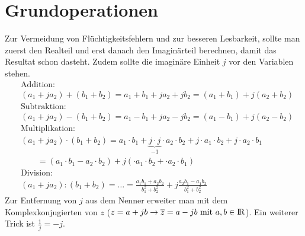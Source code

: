 \section{Grundoperationen}
Zur Vermeidung von Flüchtigkeitsfehlern und zur besseren Lesbarkeit, sollte man
zuerst den Realteil und erst danach den Imaginärteil berechnen, damit das Resultat schon  dasteht. Zudem sollte die imaginäre Einheit $j$ vor den Variablen stehen.
\begin{align*}
&\text{Addition:}\\
&(a_1+ja_2) + (b_1+b_2)= a_1+b_1+ja_2+jb_2 = (a_1+b_1)+j(a_2+b_2) \\
&\text{Subtraktion:}\\
&(a_1+ja_2) - (b_1+b_2)=  a_1-b_1+ja_2-jb_2 = (a_1-b_1)+j(a_2-b_2)   \\
&\text{Multiplikation:}\\
&(a_1+ja_2) \cdot (b_1+b_2)=  a_1\cdot b_1 + \underbrace{j\cdot j}_{-1}\cdot a_2\cdot b_2 
	+ j\cdot a_1\cdot b_2 + j\cdot a_2\cdot b_1 \\
	&\qquad=(a_1\cdot b_1 -  a_2\cdot b_2 )
	+ j(\cdot a_1\cdot b_2 + \cdot a_2\cdot b_1)   \\
&\text{Division:}\\
& (a_1+ja_2) : (b_1+b_2)=\dots=\frac{a_1b_1+a_2b_2}{b_1^2+b_2^2}
	+j\frac{a_2b_1-a_1b_2}{b_1^2+b_2^2}
\end{align*}
Zur Entfernung von $j$ aus dem Nenner erweiter man mit dem Komplexkonjugierten
von $z$ ($z=a+jb \rightarrow \overline{z}=a-jb \text{ mit } a,b\in\text{\rmfamily I\!R}$). 
Ein weiterer Trick ist $\frac{1}{j}=-j$.

